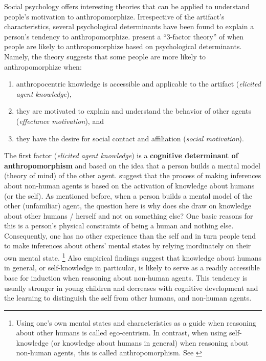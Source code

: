 \documentclass{frontiersSCNS} %
\begin{document}
Social psychology offers interesting theories that can be applied to understand people's motivation to anthropomorphize. Irrespective of the artifact's characteristics, several psychological determinants have been found to explain a person's tendency to anthropomorphize. \cite{epley_seeing_2007} present a ``3-factor theory'' of when people are likely to anthropomorphize based on psychological determinants. Namely, the theory suggests that some people are more likely to anthropomorphize when: 

\begin{enumerate}
	\item anthropocentric knowledge is accessible and applicable to the artifact (\textit{elicited agent knowledge}),
	\item they are motivated to explain and understand the behavior of other agents (\textit{effectance motivation}), and
	\item they have the desire for social contact and affiliation (\textit{social motivation}).
\end{enumerate}

The first factor (\textit{elicited agent knowledge}) is a \textbf{cognitive determinant of anthropomorphism} and based on the idea that a person builds a mental model (theory of mind) of the other agent. \cite{epley_seeing_2007} suggest that the process of making inferences about non-human agents is based on the activation of knowledge about humans (or the self). As mentioned before, when a person builds a mental model of the other (unfamiliar) agent, the question here is why does she draw on knowledge about other humans / herself and not on something else? One basic reasons for this is a person's physical constraints of being a human and nothing else. Consequently, one has no other experience than the self and in turn people tend to make inferences about others' mental states by relying inordinately on their own mental state. \footnote{Using one's own mental states and characteristics as a guide when reasoning about other humans is called ego-centrism. In contrast, when using self-knowledge (or knowledge about humans in general) when reasoning about non-human agents, this is called anthropomorphism. See \cite{epley_seeing_2007}} Also empirical findings suggest that knowledge about humans in general, or self-knowledge in particular, is likely to serve as a readily accessible base for induction when reasoning about non-human agents. This tendency is usually stronger in young children and decreases with cognitive development and the learning to distinguish the self from other humans, and non-human agents. 
	
\end{document}
